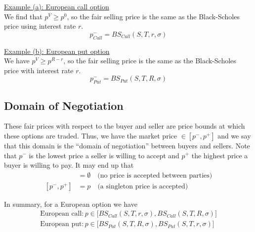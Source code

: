 \documentclass[12pt]{article}
\newlength\tindent
\renewcommand{\indent}{\hspace*{\tindent}}
\begin{document}
\underline{Example (a): European call option} \\

\indent We find that $p^V \geq p^0$, so the fair selling price is the same as the Black-Scholes price using interest rate $r$.
\begin{equation*}
	p^-_{Call} = BS_{Call}(S, T, r, \sigma)
\end{equation*}


\underline{Example (b): European put option} \\

\indent We have $p^V \geq p^{R - r}$, so the fair selling price is the same as the Black-Scholes price with interest rate $r$.
\begin{equation*}
	p^-_{Put} = BS_{Put}(S, T, R, \sigma)
\end{equation*}

\subsection{Domain of Negotiation}

\indent These fair prices with respect to the buyer and seller are price bounds at which these options are traded. Thus, we have the market price $\in [p^-, p^+]$ and we say that this domain is the ``domain of negotiation'' between buyers and sellers. Note that $p^-$ is the lowest price a seller is willing to accept and $p^+$ the highest price a buyer is willing to pay. It may end up that
\begin{align*}
	[p^-, p^+] &= \emptyset \quad \text{(no price is accepted between parties)} \\
	[p^-, p^+] &= {p} \quad \text{(a singleton price is accepted)}
\end{align*}

In summary, for a European option we have
\begin{align*}
	\text{European call}: p \in \Big[ BS_{Call}(S, T, r, \sigma), BS_{Call}(S, T, R, \sigma) \Big] \\
	\text{European put}: p \in \Big[ BS_{Put}(S, T, R, \sigma), BS_{Put}(S, T, r, \sigma) \Big]
\end{align*}
\end{document}
